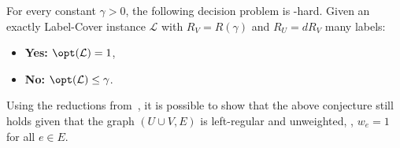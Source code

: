 \begin{conjecture}
  For every constant $\gamma > 0$, the following decision problem is -hard.
  Given an exactly  Label-Cover instance
  $\mathcal{L}$ with $R_V=R(\gamma)$ and $R_U = d R_V$ many labels:
  \begin{itemize}
  \item {\bf Yes:} $\opt(\mathcal{L}) = 1$,
  \item {\bf No:} $\opt(\mathcal{L})\le \gamma$.
  \end{itemize}
%
%
%
%
%
%
\label{conj:dtoone}
\end{conjecture}
%
Using the reductions from~\cite{DMR}, it is possible to show that the
above conjecture still holds given that the graph $(U\cup V, E)$ is
left-regular and unweighted, \ie, $w_e = 1$ for all $e\in E$.
%
